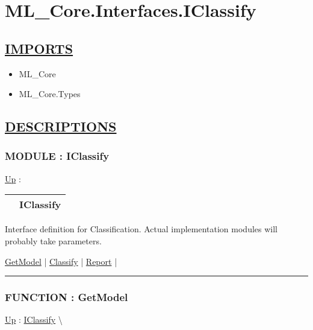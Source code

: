 \chapter*{ML\_Core.Interfaces.IClassify}
\hypertarget{ecldoc:toc:ML_Core.Interfaces.IClassify}{}

\section*{\underline{IMPORTS}}
\begin{itemize}
\item ML\_Core
\item ML\_Core.Types
\end{itemize}

\section*{\underline{DESCRIPTIONS}}
\subsection*{MODULE : IClassify}
\hypertarget{ecldoc:ML_Core.Interfaces.IClassify}{}
\hyperlink{ecldoc:toc:ML_Core/Interfaces}{Up} :

{\renewcommand{\arraystretch}{1.5}
\begin{tabularx}{\textwidth}{|>{\raggedright\arraybackslash}l|X|}
\hline
\hspace{0pt} & IClassify \\
\hline
\end{tabularx}
}

\par
Interface definition for Classification. Actual implementation modules will probably take parameters.


\hyperlink{ecldoc:ml_core.interfaces.iclassify.getmodel}{GetModel}  |
\hyperlink{ecldoc:ml_core.interfaces.iclassify.classify}{Classify}  |
\hyperlink{ecldoc:ml_core.interfaces.iclassify.report}{Report}  |

\rule{\linewidth}{0.5pt}

\subsection*{FUNCTION : GetModel}
\hypertarget{ecldoc:ml_core.interfaces.iclassify.getmodel}{}
\hyperlink{ecldoc:ML_Core.Interfaces.IClassify}{Up} :
\hspace{0pt} \hyperlink{ecldoc:ML_Core.Interfaces.IClassify}{IClassify} \textbackslash 

